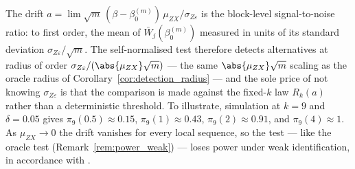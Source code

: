\begin{remark}
\label{rem:sn_local_interpretation}
The drift $a = \lim\sqrt{m}\,(\beta - \beta_0^{(m)})\,\mu_{ZX}/\sigma_{Z\varepsilon}$ is the block-level signal-to-noise ratio: to first order, the mean of $\bar{W}_j(\beta_0^{(m)})$ measured in units of its standard deviation $\sigma_{Z\varepsilon}/\sqrt{m}$. The self-normalised test therefore detects alternatives at radius of order $\sigma_{Z\varepsilon}/(\abs{\mu_{ZX}}\sqrt{m})$ --- the same $\abs{\mu_{ZX}}\sqrt{m}$ scaling as the oracle radius of Corollary~\ref{cor:detection_radius} --- and the sole price of not knowing $\sigma_{Z\varepsilon}$ is that the comparison is made against the fixed-$k$ law $R_k(a)$ rather than a deterministic threshold. To illustrate, simulation at $k = 9$ and $\delta = 0.05$ gives $\pi_9(0.5) \approx 0.15$, $\pi_9(1) \approx 0.43$, $\pi_9(2) \approx 0.91$, and $\pi_9(4) \approx 1$. As $\mu_{ZX} \to 0$ the drift vanishes for every local sequence, so the test --- like the oracle test (Remark~\ref{rem:power_weak}) --- loses power under weak identification, in accordance with \citet{dufour1997some}.
\end{remark}
